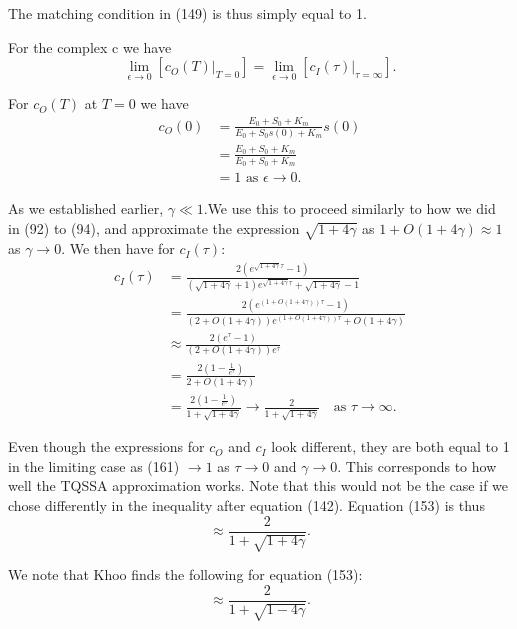 \documentclass[12pt]{article}
\begin{document}
The matching condition in (149) is thus simply equal to 1.

For the complex c we have
\begin{equation}
\lim_{\epsilon \to 0} [c_O(T) |_{T=0}] =
  \lim_{\epsilon \to 0} [c_I(\tau) |_{\tau=\infty}].
\end{equation}

For $c_O(T)$ at $T=0$ we have
\begin{align}
c_O(0) &= \frac{E_0 + S_0 + K_m}{E_0+S_0 s(0) +K_m} s(0) \\
       &= \frac{E_0 + S_0 + K_m}{E_0+S_0  +K_m} \\
       &= 1 \text { as } \epsilon \to 0.
\end{align}

As we established earlier, $\gamma \ll 1$.We use this to proceed
similarly to how we did in (92) to (94), and approximate the
expression $\sqrt{1+4\gamma}$ as $1+O(1+4\gamma) \approx 1$ as
$\gamma \to 0$. We then have for $c_I(\tau)$:
\begin{align}
c_I(\tau) &=
     \frac{2(e^{\sqrt{1+4\gamma} \tau} - 1)}
   {(\sqrt{1+4\gamma} + 1) e^{\sqrt{1+4\gamma} \tau} + \sqrt{1+4\gamma} - 1} \\
&= \frac{2(e^{(1+O(1+4\gamma)) \tau} - 1)}
        {(2 + O(1+4\gamma)) e^{(1+O(1+4\gamma)) \tau} + O(1+4\gamma)} \\
&\approx \frac{2(e^{\tau} - 1)}
              {(2 + O(1+4\gamma)) e^{\tau}} \\
&= \frac{2(1 - \frac{1}{e^{\tau}})}
        {2 + O(1+4\gamma)} \\
&= \frac{2(1 - \frac{1}{e^{\tau}})}
        {1 + \sqrt{1+4\gamma}}
   \to \frac{2} {1 + \sqrt{1+4\gamma}} \quad \text{as } \tau \to \infty.
\end{align}

Even though the expressions for $c_O$ and $c_I$ look different, they
are both equal to 1 in the limiting case as (161) $\to 1$ as
$\tau \to 0$ and $\gamma \to 0$. This corresponds to how well the
TQSSA approximation works. Note that this would not be the case if we
chose differently in the inequality after equation (142). Equation
(153) is thus
\begin{equation}
\approx \frac{2} {1 + \sqrt{1+4\gamma}}.
\end{equation}

We note that Khoo finds the following for equation (153):
\begin{equation}
\approx \frac{2}{1+\sqrt{1-4\gamma}}.
\end{equation}
\end{document}
